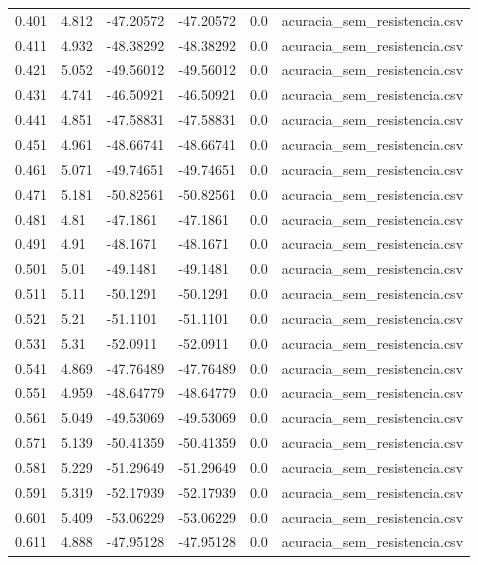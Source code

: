 \begin{table}
\begin{tabular}{llllll}
0.401 & 4.812 & -47.20572 & -47.20572 & 0.0 & acuracia\_sem\_resistencia.csv \\
0.411 & 4.932 & -48.38292 & -48.38292 & 0.0 & acuracia\_sem\_resistencia.csv \\
0.421 & 5.052 & -49.56012 & -49.56012 & 0.0 & acuracia\_sem\_resistencia.csv \\
0.431 & 4.741 & -46.50921 & -46.50921 & 0.0 & acuracia\_sem\_resistencia.csv \\
0.441 & 4.851 & -47.58831 & -47.58831 & 0.0 & acuracia\_sem\_resistencia.csv \\
0.451 & 4.961 & -48.66741 & -48.66741 & 0.0 & acuracia\_sem\_resistencia.csv \\
0.461 & 5.071 & -49.74651 & -49.74651 & 0.0 & acuracia\_sem\_resistencia.csv \\
0.471 & 5.181 & -50.82561 & -50.82561 & 0.0 & acuracia\_sem\_resistencia.csv \\
0.481 & 4.81 & -47.1861 & -47.1861 & 0.0 & acuracia\_sem\_resistencia.csv \\
0.491 & 4.91 & -48.1671 & -48.1671 & 0.0 & acuracia\_sem\_resistencia.csv \\
0.501 & 5.01 & -49.1481 & -49.1481 & 0.0 & acuracia\_sem\_resistencia.csv \\
0.511 & 5.11 & -50.1291 & -50.1291 & 0.0 & acuracia\_sem\_resistencia.csv \\
0.521 & 5.21 & -51.1101 & -51.1101 & 0.0 & acuracia\_sem\_resistencia.csv \\
0.531 & 5.31 & -52.0911 & -52.0911 & 0.0 & acuracia\_sem\_resistencia.csv \\
0.541 & 4.869 & -47.76489 & -47.76489 & 0.0 & acuracia\_sem\_resistencia.csv \\
0.551 & 4.959 & -48.64779 & -48.64779 & 0.0 & acuracia\_sem\_resistencia.csv \\
0.561 & 5.049 & -49.53069 & -49.53069 & 0.0 & acuracia\_sem\_resistencia.csv \\
0.571 & 5.139 & -50.41359 & -50.41359 & 0.0 & acuracia\_sem\_resistencia.csv \\
0.581 & 5.229 & -51.29649 & -51.29649 & 0.0 & acuracia\_sem\_resistencia.csv \\
0.591 & 5.319 & -52.17939 & -52.17939 & 0.0 & acuracia\_sem\_resistencia.csv \\
0.601 & 5.409 & -53.06229 & -53.06229 & 0.0 & acuracia\_sem\_resistencia.csv \\
0.611 & 4.888 & -47.95128 & -47.95128 & 0.0 & acuracia\_sem\_resistencia.csv \\

\end{tabular}
\end{table}
